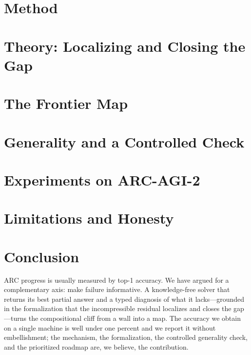 \documentclass[11pt]{article}
\begin{document}
\section{Method}\label{sec:method}


\section{Theory: Localizing and Closing the Gap}\label{sec:theory}


\section{The Frontier Map}\label{sec:frontier}


\section{Generality and a Controlled Check}\label{sec:generality}


\section{Experiments on ARC-AGI-2}\label{sec:experiments}


\section{Limitations and Honesty}\label{sec:limitations}


\section{Conclusion}
ARC progress is usually measured by top-1 accuracy. We have argued for a complementary axis: make failure
informative. A knowledge-free solver that returns its best partial answer and a typed diagnosis of what it
lacks---grounded in the formalization that the incompressible residual localizes and closes the gap---turns the
compositional cliff from a wall into a map. The accuracy we obtain on a single machine is well under one
percent and we report it without embellishment; the mechanism, the formalization, the controlled generality
check, and the prioritized roadmap are, we believe, the contribution.



\end{document}
